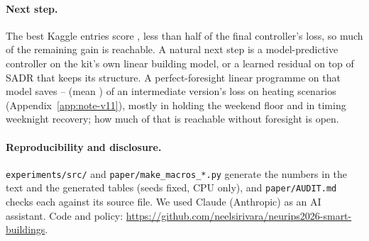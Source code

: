 \paragraph{Next step.} The best Kaggle entries score \FinKagBest, less than half of the final controller's loss, so much of the remaining gain is reachable. A natural next step is a model-predictive controller on the kit's own linear building model, or a learned residual on top of SADR that keeps its structure. A perfect-foresight linear programme on that model saves \RElvLpMin--\RElvLpMax{} (mean \RElvLpMean) of an intermediate version's loss on \RElvLpN{} heating scenarios (Appendix~\ref{app:note-v11}), mostly in holding the weekend floor and in timing weeknight recovery; how much of that is reachable without foresight is open.

\paragraph{Reproducibility and disclosure.} \texttt{experiments/src/} and \texttt{paper/make\_macros\_*.py} generate the numbers in the text and the generated tables (seeds fixed, CPU only), and \texttt{paper/AUDIT.md} checks each against its source file. We used Claude (Anthropic) as an AI assistant. Code and policy: \url{https://github.com/neelsirivara/neurips2026-smart-buildings}.
